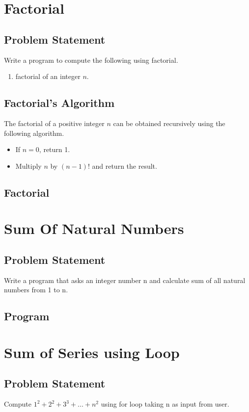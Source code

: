 \documentclass[11pt]{report}
\begin{document}
\chapter{Factorial}
\section{Problem Statement}
Write a program to compute the following using factorial.
\begin{enumerate}
  \item factorial of an integer $n$.
\end{enumerate}
\section{Factorial's Algorithm}

The factorial of a positive integer $n$ can be obtained recursively using the following algorithm.
\begin{itemize}
\item If $n=0$, return 1.
\item Multiply $n$ by $(n-1)!$ and return the result. 
\end{itemize}
\section{Factorial}
        
  
\chapter{Sum Of Natural Numbers}
\section{Problem Statement}
Write a program that asks an integer number n and calculate sum of all natural numbers from 1 to n.

\section{Program}



\chapter{Sum of Series using Loop}
\section{Problem Statement}
Compute $1^2+2^2+3^3+...+n^2$ using for loop taking n as input from user.
\end{document}
